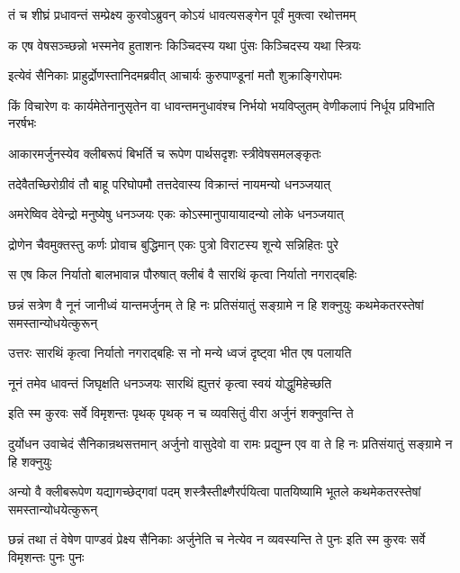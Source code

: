 \twolineshloka
{तं च शीघ्रं प्रधावन्तं सम्प्रेक्ष्य कुरवोऽब्रुवन्}
{कोऽयं धावत्यसङ्गेन पूर्वं मुक्त्वा रथोत्तमम्}


\twolineshloka
{क एष वेषसञ्च्छन्नो भस्मनेव हुताशनः}
{किञ्चिदस्य यथा पुंसः किञ्चिदस्य यथा स्त्रियः}


\twolineshloka
{इत्येवं सैनिकाः प्राहुर्द्रोणस्तानिदमब्रवीत्}
{आचार्यः कुरुपाण्डूनां मतौ शुक्राङ्गिरोपमः}


\threelineshloka
{किं विचारेण वः कार्यमेतेनानुसृतेन वा}
{धावन्तमनुधावंश्च निर्भयो भयविप्लुतम्}
{वेणीकलापं निर्धूय प्रविभाति नरर्षभः}


\twolineshloka
{आकारमर्जुनस्येव क्लीबरूपं बिभर्ति च}
{रूपेण पार्थसदृशः स्त्रीवेषसमलङ्कृतः}


\twolineshloka
{तदेवैतच्छिरोग्रीवं तौ बाहू परिघोपमौ}
{तत्तदेवास्य विक्रान्तं नायमन्यो धनञ्जयात्}


\twolineshloka
{अमरेष्विव देवेन्द्रो मनुष्येषु धनञ्जयः}
{एकः कोऽस्मानुपायायादन्यो लोके धनञ्जयात्}


\twolineshloka
{द्रोणेन चैवमुक्तस्तु कर्णः प्रोवाच बुद्धिमान्}
{एकः पुत्रो विराटस्य शून्ये सन्निहितः पुरे}


\twolineshloka
{स एष किल निर्यातो बालभावान्न पौरुषात्}
{क्लीबं वै सारथिं कृत्वा निर्यातो नगराद्बहिः}


\threelineshloka
{छन्नं सत्रेण वै नूनं जानीध्वं यान्तमर्जुनम्}
{ते हि नः प्रतिसंयातुं सङ्ग्रामे न हि शक्नुयुः}
{कथमेकतरस्तेषां समस्तान्योधयेत्कुरून्}


\twolineshloka
{उत्तरः सारथिं कृत्वा निर्यातो नगराद्बहिः}
{स नो मन्ये ध्वजं दृष्ट्वा भीत एष पलायति}




\twolineshloka
{नूनं तमेव धावन्तं जिघृक्षति धनञ्जयः}
{सारथिं ह्युत्तरं कृत्वा स्वयं योद्धुमिहेच्छति}



\twolineshloka
{इति स्म कुरवः सर्वे विमृशन्तः पृथक् पृथक्}
{न च व्यवसितुं वीरा अर्जुनं शक्नुवन्ति ते}


\threelineshloka
{दुर्योधन उवाचेदं सैनिकान्रथसत्तमान्}
{अर्जुनो वासुदेवो वा रामः प्रद्युम्न एव वा}
{ते हि नः प्रतिसंयातुं सङ्ग्रामे न हि शक्नुयुः}


\threelineshloka
{अन्यो वै क्लीबरूपेण यद्यागच्छेद्गवां पदम्}
{शस्त्रैस्तीक्ष्णैरर्पयित्वा पातयिष्यामि भूतले}
{कथमेकतरस्तेषां समस्तान्योधयेत्कुरून्}



\threelineshloka
{छन्नं तथा तं वेषेण पाण्डवं प्रेक्ष्य सैनिकाः}
{अर्जुनेति च नेत्येव न व्यवस्यन्ति ते पुनः}
{इति स्म कुरवः सर्वे विमृशन्तः पुनः पुनः}


